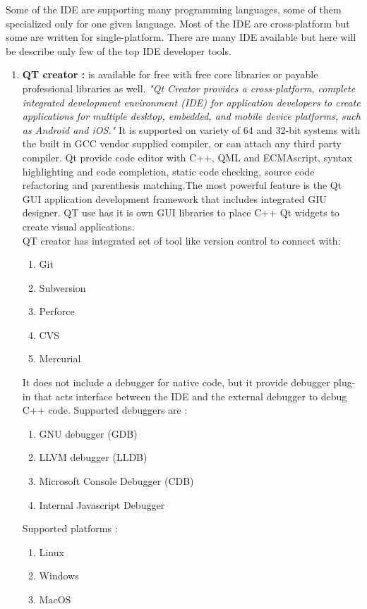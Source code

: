 \documentclass[12pt]{article}
\begin{document}
Some of the IDE are supporting many programming languages, some of them specialized only for one given language. Most of the IDE are cross-platform but some are written for single-platform. There are many IDE available but here will be describe only few of the top IDE developer tools.\\
{\setlength{\parindent}{0cm}
\begin{enumerate}
\item \textbf{QT creator : }is available for free with free core libraries or payable professional libraries as well. \textit{"Qt Creator provides a cross-platform, complete integrated development environment (IDE) for application developers to create applications for multiple desktop, embedded, and mobile device platforms, such as Android and iOS."}\cite{QT} It is supported on variety of 64 and 32-bit systems with the built in GCC vendor supplied compiler, or can attach any third party compiler. Qt provide code editor with C++, QML and ECMAscript, syntax highlighting and code completion, static code checking, source code refactoring and parenthesis matching.The most powerful feature is the Qt GUI application development framework that includes integrated GIU designer. QT use has it is own GUI libraries to place C++ Qt widgets to create visual applications.\\

QT creator has integrated set of tool like version control to connect with:
\begin{enumerate}
\item Git
\item Subversion
\item Perforce
\item CVS
\item Mercurial
\end{enumerate}

It does not include  a debugger for native code, but it provide debugger plug-in that acts interface between the IDE and the external debugger to debug C++ code. Supported debuggers are :
\begin{enumerate}
\item GNU debugger (GDB)
\item LLVM debugger (LLDB)
\item Microsoft Console Debugger (CDB)
\item Internal Javascript Debugger
\end{enumerate}

Supported platforms : 
\begin{enumerate}
\item Linux
\item Windows
\item MacOS
\end{enumerate}


\end{enumerate}}
\end{document}
